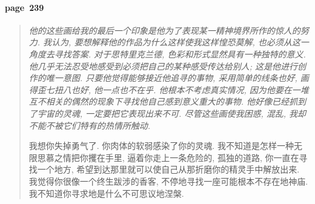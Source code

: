 \paragraph*{page~239}
\begin{quotation}
    \itshape
    他的这些画给我的最后一个印象是他为了表现某一精神境界所作的惊人的努力. 我认为, 要想解释他的作品为什么这样使我这样惶恐莫解, 也必须从这一角度去寻找答案. 对于思特里克兰德, 色彩和形式显然具有一种独特的意义. 他几乎无法忍受地感受到必须把自己的某种感受传达给别人; 这是他进行创作的唯一意图. 只要他觉得能够接近他追寻的事物, 采用简单的线条也好, 画得歪七扭八也好, 他一点也不在乎. 他根本不考虑真实情况, 因为他要在一堆互不相关的偶然的现象下寻找他自己感到意义重大的事物. 他好像已经抓到了宇宙的灵魂, 一定要把它表现出来不可. 尽管这些画使我困惑, 混乱, 我却不能不被它们特有的热情所触动.

    我想你失掉勇气了. 你肉体的软弱感染了你的灵魂. 我不知道是怎样一种无限思慕之情把你攫在手里, 逼着你走上一条危险的, 孤独的道路, 你一直在寻找一个地方, 希望到达那里就可以使自己从那折磨你的精灵手中解放出来. 我觉得你很像一个终生跋涉的香客, 不停地寻找一座可能根本不存在地神庙. 我不知道你寻求地是什么不可思议地涅槃. 
\end{quotation}

